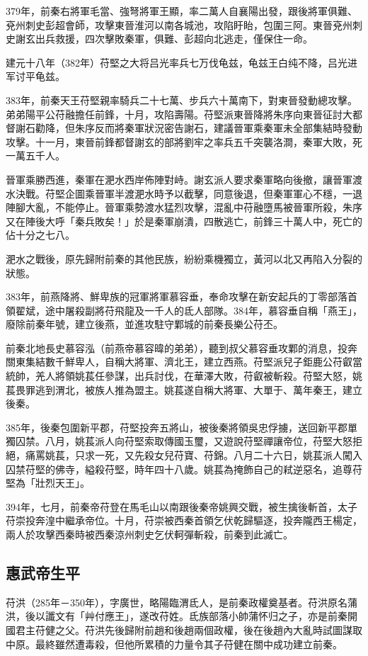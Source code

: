 379年，前秦右將軍毛當、強弩將軍王顯，率二萬人自襄陽出發，跟後將軍俱難、兗州刺史彭超會師，攻擊東晉淮河以南各城池，攻陷盱眙，包圍三阿。東晉兗州刺史謝玄出兵救援，四次擊敗秦軍，俱難、彭超向北逃走，僅保住一命。

建元十八年（382年）苻堅之大将吕光率兵七万伐龟兹，龟兹王白纯不降，吕光进军讨平龟兹。

383年，前秦天王苻堅親率騎兵二十七萬、步兵六十萬南下，對東晉發動總攻擊。弟弟陽平公苻融擔任前鋒，十月，攻陷壽陽。苻堅派東晉降將朱序向東晉征討大都督謝石勸降，但朱序反而將秦軍狀況密告謝石，建議晉軍乘秦軍未全部集結時發動攻擊。十一月，東晉前鋒都督謝玄的部將劉牢之率兵五千突襲洛澗，秦軍大敗，死一萬五千人。

晉軍乘勝西進，秦軍在淝水西岸佈陣對峙。謝玄派人要求秦軍略向後撤，讓晉軍渡水決戰。苻堅企圖乘晉軍半渡淝水時予以截擊，同意後退，但秦軍軍心不穩，一退陣腳大亂，不能停止。晉軍乘勢渡水猛烈攻擊，混亂中苻融墮馬被晉軍所殺，朱序又在陣後大呼「秦兵敗矣！」於是秦軍崩潰，四散逃亡，前鋒三十萬人中，死亡的佔十分之七八。

淝水之戰後，原先歸附前秦的其他民族，紛紛乘機獨立，黃河以北又再陷入分裂的狀態。

383年，前燕降將、鮮卑族的冠軍將軍慕容垂，奉命攻擊在新安起兵的丁零部落首領翟斌，途中屠殺副將苻飛龍及一千人的氐人部隊。384年，慕容垂自稱「燕王」，廢除前秦年號，建立後燕，並進攻駐守鄴城的前秦長樂公苻丕。

前秦北地長史慕容泓（前燕帝慕容暐的弟弟），聽到叔父慕容垂攻鄴的消息，投奔關東集結數千鮮卑人，自稱大將軍、濟北王，建立西燕。苻堅派兒子鉅鹿公苻叡當統帥，羌人將領姚萇任參謀，出兵討伐，在華澤大敗，苻叡被斬殺。苻堅大怒，姚萇畏罪逃到渭北，被族人推為盟主。姚萇遂自稱大將軍、大單于、萬年秦王，建立後秦。

385年，後秦包圍新平郡，苻堅投奔五將山，被後秦將領吳忠俘擄，送回新平郡單獨囚禁。八月，姚萇派人向苻堅索取傳國玉璽，又遊說苻堅禪讓帝位，苻堅大怒拒絕，痛罵姚萇，只求一死，又先殺女兒苻寶、苻錦。八月二十六日，姚萇派人闖入囚禁苻堅的佛寺，縊殺苻堅，時年四十八歲。姚萇為掩飾自己的弒逆惡名，追尊苻堅為「壯烈天王」。

394年，七月，前秦帝苻登在馬毛山以南跟後秦帝姚興交戰，被生擒後斬首，太子苻崇投奔湟中繼承帝位。十月，苻崇被西秦首領乞伏乾歸驅逐，投奔隴西王楊定，兩人於攻擊西秦時被西秦涼州刺史乞伏軻彈斬殺，前秦到此滅亡。

\subsection{惠武帝生平}

苻洪（285年－350年），字廣世，略陽臨渭氐人，是前秦政權奠基者。苻洪原名蒲洪，後以讖文有「艸付應王」，遂改苻姓。氐族部落小帥蒲怀归之子，亦是前秦開國君主苻健之父。苻洪先後歸附前趙和後趙兩個政權，後在後趙內大亂時試圖謀取中原。最終雖然遭毒殺，但他所累積的力量令其子苻健在關中成功建立前秦。

